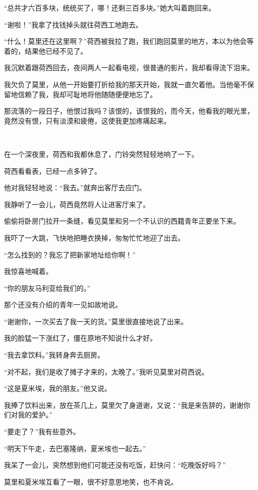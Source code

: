 \par “总共才六百多块，统统买了，哪！还剩三百多块。”她大叫着跑回来。
\par “谢啦！”我拿了找钱掉头就往荷西工地跑去。
\par “什么！莫里还在这里啊？”荷西被我拉了跑，我们跑回莫里的地方，本以为他会等着的，结果他已经不见了。
\par 我沉默着跟荷西回去，夜间两人一起看电视，很普通的影片，我却看得流下泪来。
\par 我欠负了莫里，从他一开始要打折给我的那天开始，我就一直欠着他。当他毫不保留地信赖了我，我却可耻地将他随随便便地忘了。
\par 那流落的一段日子，他恨过我吗？该恨的，该恨我的，而今天，他看我的眼光里，竟然没有恨，只有淡漠和疲倦，这使我更加疼痛起来。
\par  
\par 在一个深夜里，荷西和我都休息了，门铃突然轻轻地响了一下。
\par 荷西看看表，已经一点多钟了。
\par 他对我轻轻地说：“我去。”就奔出客厅去应门。
\par 我静听了一会儿，荷西竟然将人让进客厅来了。
\par 偷偷将卧房门拉开一条缝，看见莫里和另一个不认识的西籍青年正要坐下来。
\par 我吓了一大跳，飞快地把睡衣换掉，匆匆忙忙地迎了出去。
\par “怎么找到的？我忘了把新家地址给你啊！”
\par 我惊喜地喊着。
\par “你的朋友马利亚给我们的。”
\par 那个还没有介绍的青年一见如故地说。
\par “谢谢你，一次买去了我一天的货。”莫里很直接地说了出来。
\par 我的脸猛一下涨红了，僵在原地不知说什么才好。
\par “我去拿饮料。”我转身奔去厨房。
\par “对不起，我们是收了摊子才来的，太晚了。”我听见莫里对荷西说。
\par “这是夏米埃，我的朋友。”他又说。
\par 我捧了饮料出来，放在茶几上，莫里欠了身道谢，又说：“我是来告辞的，谢谢你们对我的爱护。”
\par “要走了？”我有些意外。
\par “明天下午走，去巴塞隆纳，夏米埃也一起去。”
\par 我呆了一会儿，突然想到他们可能还没有吃饭，赶快问：“吃晚饭好吗？”
\par 莫里和夏米埃互看了一眼，很不好意思地笑，也不肯说。
